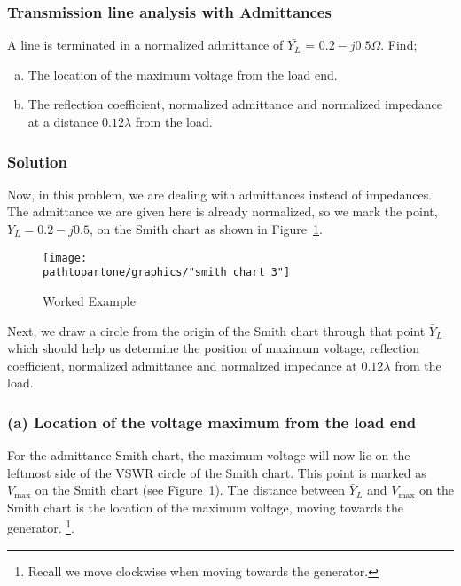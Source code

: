 \begin{exmp}
\subsubsection*{Transmission line analysis with Admittances}
A line is terminated in a normalized admittance of $\bar{Y_{L}}$ =  $0.2-j0.5\varOmega$. Find;
\begin{enumerate}[(a)]
\item The location of the maximum voltage from the load end. 
\item The reflection coefficient, normalized admittance and normalized impedance at a distance $0.12\lambda$ from the load.
\end{enumerate}

\subsubsection*{Solution}
Now, in this problem, we are dealing with admittances instead of impedances. The admittance we are given here is already normalized, so we mark the point, $\bar{Y_L} = 0.2 - j0.5$, on the Smith chart as shown in Figure~\ref{fig:workedexample3}.
\begin{figure}[h]
\centering
\texttt{[image: \\pathtopartone/graphics/"smith chart 3"]}
\caption{Worked Example}
\label{fig:workedexample3}
\end{figure}

Next, we draw a circle from the origin of the Smith chart through that point $\bar{Y}_L$ which should help us determine the position of maximum voltage, reflection coefficient, normalized admittance and normalized impedance at $0.12\lambda$ from the load.

\subsubsection*{(a) Location of the voltage maximum from the load end}
For the admittance Smith chart, the maximum voltage will now lie on the leftmost side of the VSWR circle of the Smith chart. This point is marked as $V_\max$ on the Smith chart (see Figure~\ref{fig:workedexample3}). The distance between $\bar{Y}_L$ and $V_\max$ on the Smith chart is the location of the maximum voltage, moving towards the generator. \footnote{
Recall we move clockwise when moving towards the generator.
}.


\end{exmp}
